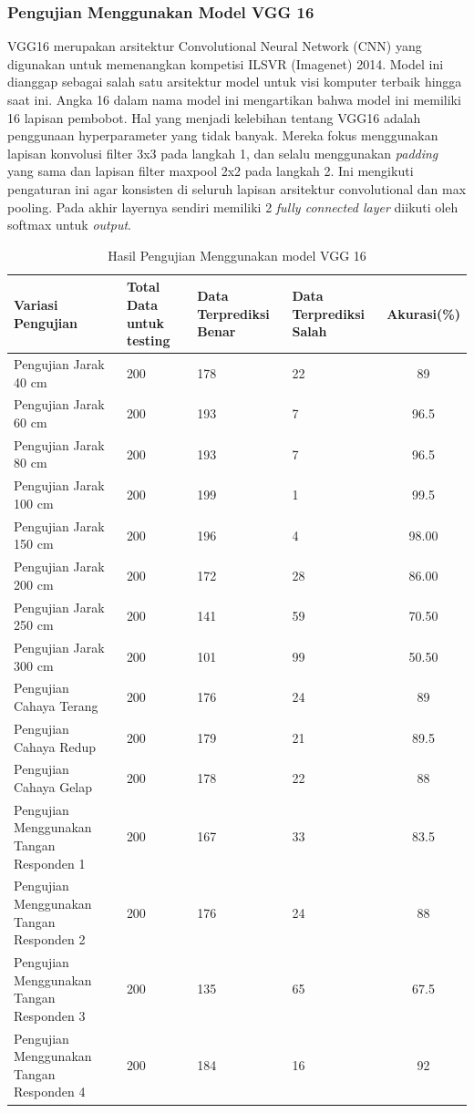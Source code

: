 \subsubsection{Pengujian Menggunakan Model VGG 16}
\label{subsubsec:Pengujian Menggunakan Model VGG 16}

VGG16 merupakan arsitektur Convolutional Neural Network (CNN) yang digunakan untuk memenangkan kompetisi ILSVR (Imagenet) 2014. Model ini dianggap sebagai salah satu arsitektur model untuk visi komputer terbaik hingga saat ini. Angka 16 dalam nama model ini mengartikan bahwa model ini memiliki 16 lapisan pembobot. Hal yang menjadi kelebihan tentang VGG16 adalah penggunaan hyperparameter yang tidak banyak. Mereka fokus menggunakan lapisan konvolusi filter 3x3 pada langkah 1, dan selalu menggunakan \emph{padding} yang sama dan lapisan filter maxpool 2x2 pada langkah 2. Ini mengikuti pengaturan ini agar konsisten di seluruh lapisan arsitektur convolutional dan max pooling. Pada akhir layernya sendiri memiliki 2 \emph{fully connected layer} diikuti oleh softmax untuk \emph{output}.

\begin{longtable}[!htb]{|M{25mm}|M{30mm}|M{30mm}|M{30mm}|c|}
  \caption{Hasil Pengujian Menggunakan model VGG 16}
  \label{tb:Hasil Pengujian Menggunakan model VGG 16}\\
  \hline
  \textbf{Variasi Pengujian} & \textbf{Total Data untuk testing} & \textbf{Data Terprediksi Benar} & \textbf{Data Terprediksi Salah} & \textbf{Akurasi(\%)} \\ 
  \hline
  \endhead
  Pengujian Jarak 40 cm & 200 & 178 & 22 & 89 \\ \hline
  Pengujian Jarak 60 cm & 200 & 193 & 7 & 96.5 \\ \hline
  Pengujian Jarak 80 cm & 200 & 193 & 7 & 96.5 \\ \hline
  Pengujian Jarak 100 cm & 200 & 199 & 1 & 99.5 \\ \hline
  Pengujian Jarak 150 cm & 200 & 196 & 4 & 98.00 \\ \hline
  Pengujian Jarak 200 cm & 200 & 172 & 28 & 86.00 \\ \hline
  Pengujian Jarak 250 cm & 200 & 141 & 59 & 70.50 \\ \hline
  Pengujian Jarak 300 cm & 200 & 101 & 99 & 50.50 \\ \hline
  Pengujian Cahaya Terang & 200 & 176 & 24 & 89 \\ \hline
  Pengujian Cahaya Redup & 200 & 179 & 21 & 89.5 \\ \hline
  Pengujian Cahaya Gelap & 200 & 178 & 22 & 88 \\ \hline
  Pengujian Menggunakan Tangan Responden 1 & 200 & 167 & 33 & 83.5 \\ \hline
  Pengujian Menggunakan Tangan Responden 2 & 200 & 176 & 24 & 88 \\ \hline
  Pengujian Menggunakan Tangan Responden 3 & 200 & 135 & 65 & 67.5 \\ \hline
  Pengujian Menggunakan Tangan Responden 4 & 200 & 184 & 16 & 92 \\ \hline
\end{longtable}

